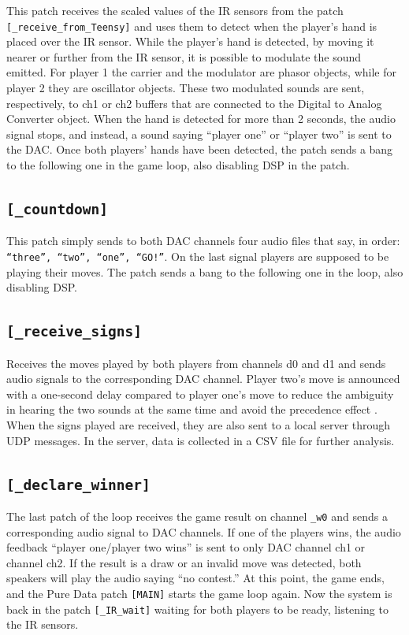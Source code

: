 \documentclass[11pt,a4paper]{report}
\begin{document}
This patch receives the scaled values of the IR sensors from the patch 
\texttt{[\_receive\_from\_Teensy]}
and uses them to detect when the player's hand is placed over the IR sensor. While the player's hand is detected, by moving it nearer or further from the IR sensor, it is possible to modulate the sound emitted. For player 1 the carrier and the modulator are phasor objects, while for player 2 they are oscillator objects. These two modulated sounds are sent, respectively, to ch1 or ch2 buffers that are connected to the Digital to Analog Converter object. When the hand is detected for more than 2 seconds, the audio signal stops, and instead, a sound saying “player one” or “player two” is sent to the DAC. Once both players' hands have been detected, the patch sends a bang to the following one in the game loop, also disabling DSP in the patch.

\subsection*{\texttt{[\_countdown]}}
This patch simply sends to both DAC channels four audio files that say, in order: \texttt{“three”, “two”, “one”, “GO!”}. On the last signal players are supposed to be playing their moves. The patch sends a bang to the following one in the loop, also disabling DSP.

\subsection*{\texttt{[\_receive\_signs]}}

Receives the moves played by both players from channels d0 and d1 and sends audio signals to the corresponding DAC channel. Player two's move is announced with a one-second delay compared to player one's move to reduce the ambiguity in hearing the two sounds at the same time and avoid the precedence effect \cite*{1}. When the signs played are received, they are also sent to a local server through UDP messages. In the server, data is collected in a CSV file for further analysis.

\subsection*{\texttt{[\_declare\_winner]}}
The last patch of the loop receives the game result on channel \texttt{\_w0} and sends a corresponding audio signal to DAC channels. If one of the players wins, the audio feedback “player one/player two wins” is sent to only DAC channel ch1 or channel ch2. If the result is a draw or an invalid move was detected, both speakers will play the audio saying “no contest.” At this point, the game ends, and the Pure Data patch \texttt{[MAIN]} starts the game loop again. Now the system is back in the patch \texttt{[\_IR\_wait]} waiting for both players to be ready, listening to the IR sensors.
\end{document}
